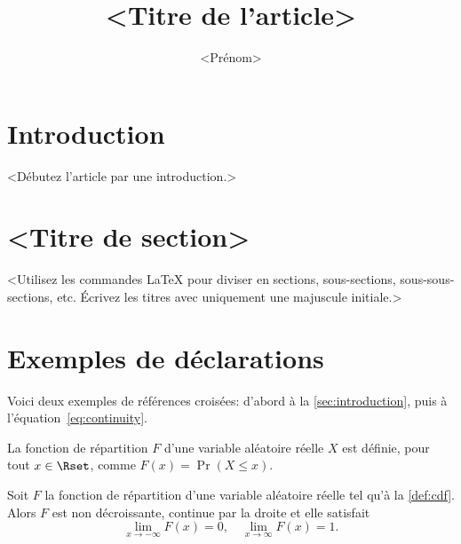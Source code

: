 \documentclass[english,french,review]{cjs-rcs-article}
\title{<Titre de l'article>}
\author[orcid=<id>, email=<courriel>, corresponding]
         {<Prénom> \surname{<Nom>}}
\affil{<Département, Université, Ville, Pays>}
\begin{document}
\maketitle                      %

\section{Introduction}
\label{sec:introduction}        %

<Débutez l'article par une introduction.>

\section{<Titre de section>}

<Utilisez les commandes LaTeX pour diviser en sections, sous-sections,
sous-sous-sections, etc. Écrivez les titres avec uniquement une
majuscule initiale.>

\section{Exemples de déclarations}

Voici deux exemples de références croisées: d'abord à la
\autoref{sec:introduction}, puis à l'équation~\eqref{eq:continuity}.

\begin{definition}
  \label{def:cdf}
  La fonction de répartition $F$ d'une variable aléatoire réelle $X$
  est définie, pour tout $x \in \Rset$, comme $F(x) = \Pr(X \leq x)$.
\end{definition}

\begin{theorem}
  \label{thm:continuity}
  Soit $F$ la fonction de répartition d'une variable aléatoire réelle
  tel qu'à la \autoref{def:cdf}. Alors $F$ est non décroissante,
  continue par la droite et elle satisfait
  \begin{equation}
    \label{eq:continuity}
    \lim_{x \to -\infty} F(x) = 0, \quad \lim_{x \to \infty} F(x) = 1.
  \end{equation}
\end{theorem}
\end{document}
